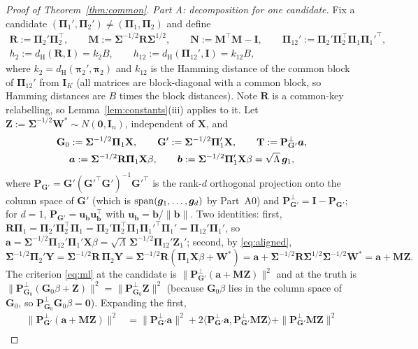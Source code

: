 \documentclass[11pt]{article}
\theoremstyle{definition}
\newcommand{\bX}{\mathbf{X}}
\newcommand{\bY}{\mathbf{Y}}
\newcommand{\bW}{\mathbf{W}}
\newcommand{\bT}{\mathbf{T}}
\newcommand{\bZ}{\mathbf{Z}}
\newcommand{\bI}{\mathbf{I}}
\newcommand{\bR}{\mathbf{R}}
\newcommand{\bM}{\mathbf{M}}
\newcommand{\bN}{\mathbf{N}}
\newcommand{\bzero}{\mathbf{0}}
\newcommand{\bSig}{\boldsymbol{\Sigma}}
\newcommand{\bpi}{\boldsymbol{\pi}}
\newcommand{\bPi}{\boldsymbol{\Pi}}
\newcommand{\dH}{d_{\mathrm{H}}}
\begin{document}
\begin{proof}[Proof of Theorem~\ref{thm:common}]
\emph{Part A: decomposition for one candidate.} Fix a candidate $(\bPi_1',\bPi_2')\ne(\bPi_1,\bPi_2)$ and define
\begin{gather*}
\bR:=\bPi_2'\bPi_2^\top,\qquad\bM:=\bSig^{-1/2}\bR\bSig^{1/2},\qquad\bN:=\bM^\top\bM-\bI,\qquad\bPi_{12}':=\bPi_2'\bPi_2^\top\bPi_1\bPi_1'^\top,\\
h_2:=\dH(\bR,\bI)=k_2B,\qquad h_{12}:=\dH(\bPi_{12}',\bI)=k_{12}B,
\end{gather*}
where $k_2=\dH(\bpi_2',\bpi_2)$ and $k_{12}$ is the Hamming distance of the common block of $\bPi_{12}'$ from $\bI_K$ (all matrices are block-diagonal with a common block, so Hamming distances are $B$ times the block distances). Note $\bR$ is a common-key relabelling, so Lemma~\ref{lem:constants}(iii) applies to it. Let $\bZ:=\bSig^{-1/2}\bW^\ast\sim N(\bzero,\bI_n)$, independent of $\bX$, and
\begin{gather*}
\mathbf G_0:=\bSig^{-1/2}\bPi_1\bX,\qquad\mathbf G':=\bSig^{-1/2}\bPi_1'\bX,\qquad\bT:=\mathbf P^\perp_{\mathbf G'}\bm a ,\\
\bm a:=\bSig^{-1/2}\bR\bPi_1\bX\beta,\qquad\bm b:=\bSig^{-1/2}\bPi_1'\bX\beta=\sqrt\Lambda\,\bg_1,
\end{gather*}
where $\mathbf P_{\mathbf G'}=\mathbf G'(\mathbf G'^\top\mathbf G')^{-1}\mathbf G'^\top$ is the rank-$d$ orthogonal projection onto the column space of $\mathbf G'$ (which is $\mathrm{span}(\bm{g}_1,\dots,\bm{g}_d)$ by Part~A0) and $\mathbf P^\perp_{\mathbf G'}=\bI-\mathbf P_{\mathbf G'}$; for $d=1$, $\mathbf P_{\mathbf G'}=\bm u_{\bm b}\bm u_{\bm b}^\top$ with $\bm u_{\bm b}=\bm b/\|\bm b\|$. Two identities: first, $\bR\bPi_1=\bPi_2'\bPi_2^\top\bPi_1=\bPi_2'\bPi_2^\top\bPi_1\bPi_1'^\top\bPi_1'=\bPi_{12}'\bPi_1'$, so $\bm a=\bSig^{-1/2}\bPi_{12}'\bPi_1'\bX\beta=\sqrt\Lambda\,\bSig^{-1/2}\bPi_{12}'\bZ_1'$; second, by \eqref{eq:aligned},
\[
\bSig^{-1/2}\bPi_2'\bY=\bSig^{-1/2}\bR\,\bPi_2\bY=\bSig^{-1/2}\bR(\bPi_1\bX\beta+\bW^\ast)=\bm a+\bSig^{-1/2}\bR\bSig^{1/2}\bSig^{-1/2}\bW^\ast=\bm a+\bM\bZ .
\]
The criterion \eqref{eq:ml} at the candidate is $\|\mathbf P^\perp_{\mathbf G'}(\bm a+\bM\bZ)\|^2$ and at the truth is $\|\mathbf P^\perp_{\mathbf G_0}(\mathbf G_0\beta+\bZ)\|^2=\|\mathbf P^\perp_{\mathbf G_0}\bZ\|^2$ (because $\mathbf G_0\beta$ lies in the column space of $\mathbf G_0$, so $\mathbf P^\perp_{\mathbf G_0}\mathbf G_0\beta=\bzero$). Expanding the first,
\begin{align*}
\|\mathbf P^\perp_{\mathbf G'}(\bm a+\bM\bZ)\|^2&=\|\mathbf P^\perp_{\mathbf G'}\bm a\|^2+2\langle\mathbf P^\perp_{\mathbf G'}\bm a,\mathbf P^\perp_{\mathbf G'}\bM\bZ\rangle+\|\mathbf P^\perp_{\mathbf G'}\bM\bZ\|^2\\

\end{align*}
\end{proof}
\end{document}
